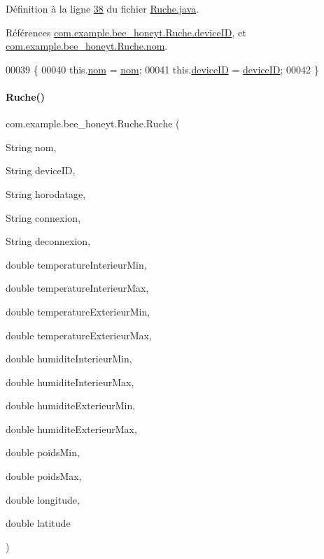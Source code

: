 Définition à la ligne \hyperlink{_ruche_8java_source_l00038}{38} du fichier \hyperlink{_ruche_8java_source}{Ruche.\+java}.



Références \hyperlink{_ruche_8java_source_l00019}{com.\+example.\+bee\+\_\+honeyt.\+Ruche.\+device\+ID}, et \hyperlink{_ruche_8java_source_l00018}{com.\+example.\+bee\+\_\+honeyt.\+Ruche.\+nom}.


\begin{DoxyCode}
00039     \{
00040         this.\hyperlink{classcom_1_1example_1_1bee__honeyt_1_1_ruche_ac72094a8a08cf8f485be1456863bc4bd}{nom} = \hyperlink{classcom_1_1example_1_1bee__honeyt_1_1_ruche_ac72094a8a08cf8f485be1456863bc4bd}{nom};
00041         this.\hyperlink{classcom_1_1example_1_1bee__honeyt_1_1_ruche_a7126c2ff9e0b3b5365e042c5309ad775}{deviceID} = \hyperlink{classcom_1_1example_1_1bee__honeyt_1_1_ruche_a7126c2ff9e0b3b5365e042c5309ad775}{deviceID};
00042     \}
\end{DoxyCode}
\mbox{\label{classcom_1_1example_1_1bee__honeyt_1_1_ruche_ae3747158da62331b68bf99f5b5bab2a6}} 
\paragraph{\texorpdfstring{Ruche()}{Ruche()}\hspace{0.1cm}{\footnotesize\ttfamily [2/3]}}
{\footnotesize\ttfamily com.\+example.\+bee\+\_\+honeyt.\+Ruche.\+Ruche (\begin{DoxyParamCaption}\item[{String}]{nom,  }\item[{String}]{device\+ID,  }\item[{String}]{horodatage,  }\item[{String}]{connexion,  }\item[{String}]{deconnexion,  }\item[{double}]{temperature\+Interieur\+Min,  }\item[{double}]{temperature\+Interieur\+Max,  }\item[{double}]{temperature\+Exterieur\+Min,  }\item[{double}]{temperature\+Exterieur\+Max,  }\item[{double}]{humidite\+Interieur\+Min,  }\item[{double}]{humidite\+Interieur\+Max,  }\item[{double}]{humidite\+Exterieur\+Min,  }\item[{double}]{humidite\+Exterieur\+Max,  }\item[{double}]{poids\+Min,  }\item[{double}]{poids\+Max,  }\item[{double}]{longitude,  }\item[{double}]{latitude }\end{DoxyParamCaption})}



